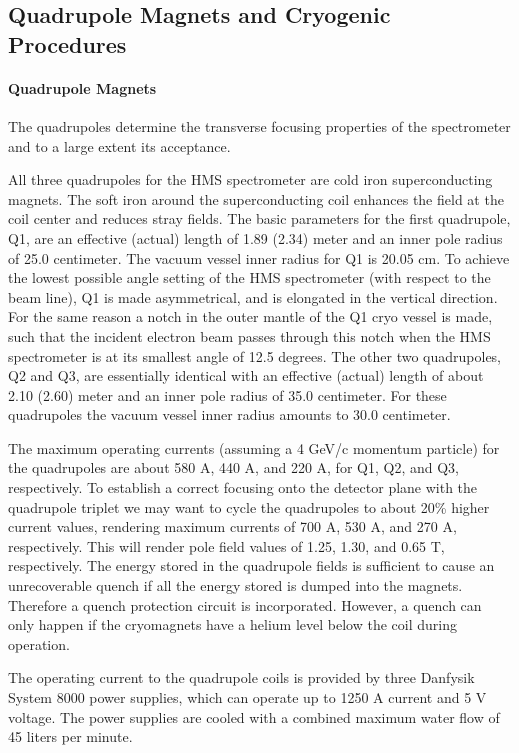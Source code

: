 {\subsection{Quadrupole Magnets and Cryogenic Procedures}

\paragraph{Quadrupole Magnets}
The quadrupoles determine the transverse focusing properties of the spectrometer
and to a large extent its acceptance.

All three quadrupoles for the HMS spectrometer are cold iron superconducting
magnets. The soft iron around the superconducting coil enhances the field at
the coil center and reduces stray fields.
The basic parameters for the first quadrupole, Q1, are an effective (actual)
length of 1.89 (2.34) meter and an inner pole radius of
25.0 centimeter. \cite{bi:yan1}
The vacuum vessel
inner radius for Q1 is 20.05 cm. To achieve the lowest possible angle
setting of the HMS spectrometer (with respect to the beam line), Q1 is
made asymmetrical, and is elongated in the vertical direction. For the same
reason a notch in the outer mantle of the Q1 cryo vessel is made, such
that the incident electron beam passes through this notch when the
HMS spectrometer is at its smallest angle of 12.5 degrees.
The other two quadrupoles, Q2 and Q3, are essentially identical with an
effective (actual) length of about 2.10 (2.60) meter and an inner pole radius
of 35.0 centimeter. For these quadrupoles the vacuum vessel inner radius
amounts to 30.0 centimeter.

The maximum operating currents (assuming a 4 GeV/c momentum particle) for the
quadrupoles are about 580 A, 440 A, and 220 A, for Q1, Q2, and Q3, respectively.
To establish a correct focusing onto the detector plane with
the quadrupole triplet we may want to cycle the quadrupoles to about 20\% higher
current values, rendering maximum currents of 700 A, 530 A, and 270 A,
respectively. This will render pole field values of 1.25, 1.30, and 0.65 T,
respectively.
The energy stored in the quadrupole fields is sufficient to cause an
unrecoverable quench if all the energy stored is dumped into the
magnets. \cite{bi:hms1}
Therefore a quench protection circuit is incorporated. However, a quench
can only happen if the cryomagnets have a helium level below the coil during
operation.

The operating current to the quadrupole coils is provided by three
Danfysik System 8000 power supplies, which can operate up to 1250 A current
and 5 V voltage. The power supplies are cooled with a combined maximum 
water flow of 45 liters per minute.

}
